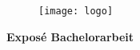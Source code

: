 \begin{titlingpage}

\begingroup
\begin{figure}[h!]
    \centering
	\texttt{[image: logo]}
\end{figure}
\let\newpage\relax%
\center\huge{\textbf{Expos\'{e} Bachelorarbeit}}
\maketitle
\endgroup

\end{titlingpage}

\tableofcontents
\listoffigures